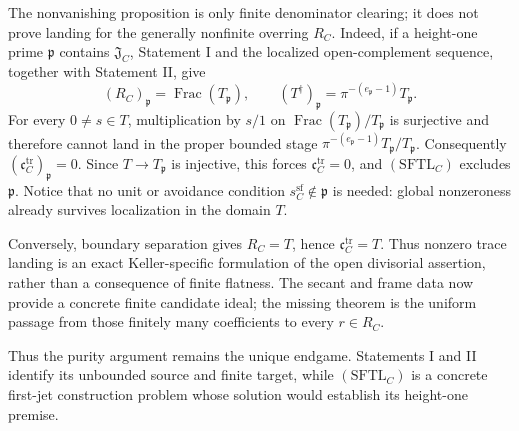 \documentclass[11pt]{article}
\theoremstyle{remark}
\theoremstyle{definition}
\DeclareMathOperator{\Frac}{Frac}
\begin{document}
The nonvanishing proposition is only finite denominator clearing; it does
not prove landing for the generally nonfinite overring \(R_C\).  Indeed, if
a height-one prime \(\mathfrak p\) contains \(\mathfrak J_C\), Statement I
and the localized open-complement sequence, together with Statement II, give
\[
  (R_C)_{\mathfrak p}=\Frac(T_{\mathfrak p}),
  \qquad
  (T^\dagger)_{\mathfrak p}
  =\pi^{-(e_{\mathfrak p}-1)}T_{\mathfrak p}.
\]
For every \(0\neq s\in T\), multiplication by \(s/1\) on
\(\Frac(T_{\mathfrak p})/T_{\mathfrak p}\) is surjective and therefore
cannot land in the proper bounded stage
\(\pi^{-(e_{\mathfrak p}-1)}T_{\mathfrak p}/T_{\mathfrak p}\).
Consequently \((\mathfrak c_C^{\mathrm{tr}})_{\mathfrak p}=0\).  Since
\(T\to T_{\mathfrak p}\) is injective, this forces
\(\mathfrak c_C^{\mathrm{tr}}=0\), and
\((\mathrm{SFTL}_C)\) excludes \(\mathfrak p\).  Notice that no unit or
avoidance condition \(s_C^{\mathrm{sf}}\notin\mathfrak p\) is needed:
global nonzeroness already survives localization in the domain \(T\).

Conversely, boundary separation gives \(R_C=T\), hence
\(\mathfrak c_C^{\mathrm{tr}}=T\).  Thus nonzero trace landing is an exact
Keller-specific formulation of the open divisorial assertion, rather than
a consequence of finite flatness.  The secant and frame data now provide a
concrete finite candidate ideal; the missing theorem is the uniform passage
from those finitely many coefficients to every \(r\in R_C\).

Thus the purity argument remains the unique endgame.  Statements I and II
identify its unbounded source and finite target, while
\((\mathrm{SFTL}_C)\) is a concrete first-jet construction problem whose
solution would establish its height-one premise.
\end{document}
